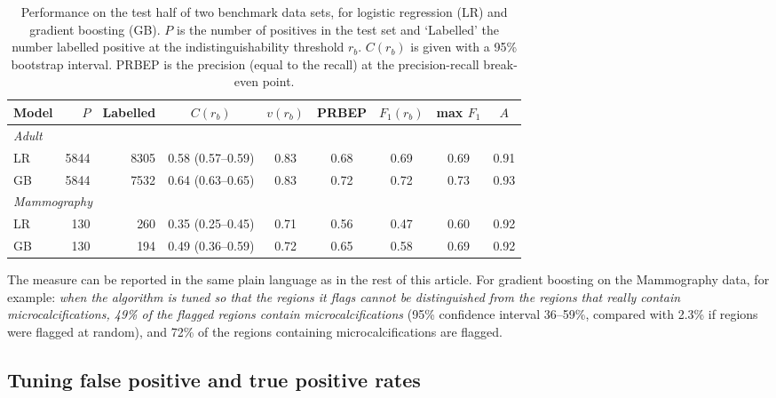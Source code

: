 \documentclass[preprint,12pt]{article}
\begin{document}
\begin{table}[tp]
\centering
\footnotesize
\setlength{\tabcolsep}{3.5pt}
\begin{tabular}{lrrcccccc}
\toprule
Model & $P$ & Labelled & $C(r_b)$ & $v(r_b)$ & PRBEP & $F_1(r_b)$ & max $F_1$ & $A$ \\
\midrule
\multicolumn{9}{l}{\it Adult} \\
LR & 5844 & 8305 & 0.58 (0.57--0.59) & 0.83 & 0.68 & 0.69 & 0.69 & 0.91 \\
GB & 5844 & 7532 & 0.64 (0.63--0.65) & 0.83 & 0.72 & 0.72 & 0.73 & 0.93 \\
\multicolumn{9}{l}{\it Mammography} \\
LR & 130 & 260 & 0.35 (0.25--0.45) & 0.71 & 0.56 & 0.47 & 0.60 & 0.92 \\
GB & 130 & 194 & 0.49 (0.36--0.59) & 0.72 & 0.65 & 0.58 & 0.69 & 0.92 \\
\bottomrule
\end{tabular}
\caption{Performance on the test half of two benchmark data sets, for logistic regression (LR) and gradient boosting (GB). $P$ is the number of positives in the test set and `Labelled' the number labelled positive at the indistinguishability threshold $r_b$. $C(r_b)$ is given with a 95\% bootstrap interval. PRBEP is the precision (equal to the recall) at the precision-recall break-even point.}
\label{tab:benchmarks}
\end{table}

The measure can be reported in the same plain language as in the rest of this article. For gradient boosting on the Mammography data, for example: {\it when the algorithm is tuned so that the regions it flags cannot be distinguished from the regions that really contain microcalcifications, 49\% of the flagged regions contain microcalcifications} (95\% confidence interval 36--59\%, compared with 2.3\% if regions were flagged at random), and 72\% of the regions containing microcalcifications are flagged.

\subsection*{Tuning false positive and true positive rates}
\end{document}
